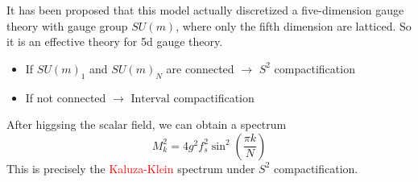 \documentclass{beamer}
\begin{document}
\begin{frame}
    It has been proposed that this model actually discretized a five-dimension gauge theory with gauge group $SU(m)$, where 
    only the fifth dimension are latticed. So it is an effective theory for 5d gauge theory.
    \begin{itemize}
        \item If $SU(m)_1$ and $SU(m)_N$ are connected $\longrightarrow$ $S^2$ compactification
        \item If not connected $\longrightarrow$ $\mathrm{Interval}$ compactification
    \end{itemize}
    After higgsing the scalar field, we can obtain a spectrum
    \begin{equation*}
        M_k^2=4g^2f_s^2\sin^2\left(\frac{\pi k}{N}\right)
    \end{equation*}
    This is precisely the \textcolor{red}{Kaluza-Klein} spectrum under $S^2$ compactification. 
\end{frame}
\end{document}
